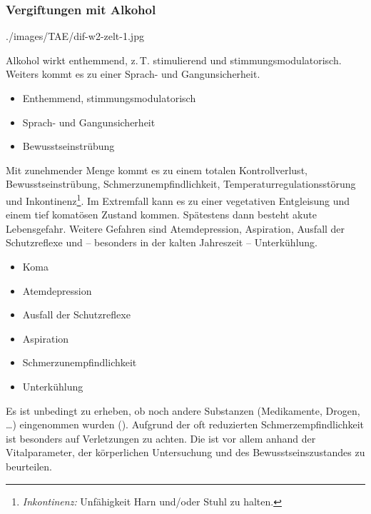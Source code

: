 {\subsubsection{Vergiftungen mit Alkohol}

{}
{./images/TAE/dif-w2-zelt-1.jpg}
{}
{}



{%
Alkohol  wirkt enthemmend, z.\,T. stimulierend und
stimmungsmodulatorisch. Weiters kommt es zu einer Sprach- 
und Gangunsicherheit. 

\bigskip

\bigskip

}{%
\begin{itemize}
    \item Enthemmend, stimmungsmodulatorisch
    \item Sprach- und Gangunsicherheit
    \item Bewusstseinstrübung
\end{itemize}
}{}{}{}

{%
Mit zunehmender Menge kommt es zu einem totalen
Kontrollverlust, Bewusstseinstrübung,
Schmerzunempfindlichkeit, Temperaturregulationsstörung und
Inkontinenz\footnote{\emph{Inkontinenz:} Unfähigkeit Harn
und/oder Stuhl zu halten.}. Im Extremfall kann es zu einer 
vegetativen Entgleisung und einem tief komatösen Zustand 
kommen. Spätestens dann besteht akute Lebensgefahr. Weitere 
Gefahren sind Atemdepression, Aspiration, Ausfall der 
Schutzreflexe und -- besonders in der kalten Jahreszeit --
Unterkühlung.
}{%
\begin{itemize}
    \item Koma
    \item Atemdepression
    \item  Ausfall der Schutzreflexe
    \item Aspiration
    \item Schmerzunempfindlichkeit
    \item Unterkühlung
\end{itemize}
}{}{}{}


Es ist unbedingt zu erheben, ob noch andere Substanzen
(Medikamente, Drogen, \ldots) eingenommen wurden
(). Aufgrund der oft reduzierten
Schmerzempfindlichkeit ist besonders auf Verletzungen zu
achten.
Die  ist vor allem anhand der
Vitalparameter, der körperlichen Untersuchung und des
Bewusstseinszustandes zu beurteilen. 





}
